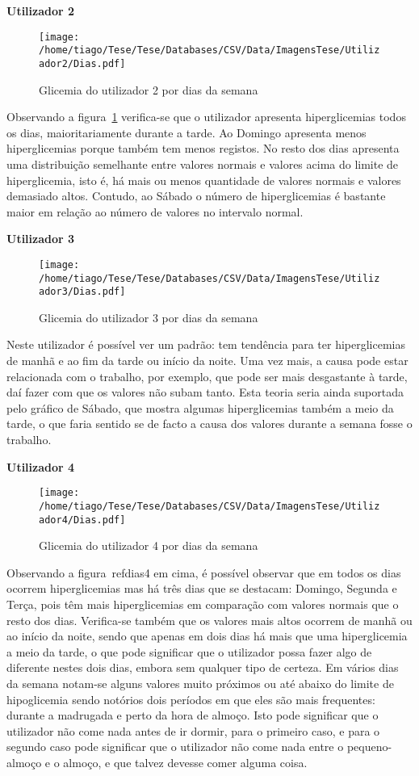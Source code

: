 \textbf{Utilizador 2}


\begin{figure}[H]
\centering
\texttt{[image: /home/tiago/Tese/Tese/Databases/CSV/Data/ImagensTese/Utilizador2/Dias.pdf]}
\caption{Glicemia do utilizador 2 por dias da semana}
\label{fig:dias2}
\end{figure}
Observando a figura~\ref{fig:dias2} verifica-se que o utilizador apresenta hiperglicemias todos os dias, maioritariamente durante a tarde. Ao Domingo apresenta menos hiperglicemias porque também tem menos registos. No resto dos dias apresenta uma distribuição semelhante entre valores normais e valores acima do limite de hiperglicemia, isto é, há mais ou menos quantidade de valores normais e valores demasiado altos. Contudo, ao Sábado o número de hiperglicemias é bastante maior em relação ao número de valores no intervalo normal.



\textbf{Utilizador 3}

\begin{figure}[H]
\centering
\texttt{[image: /home/tiago/Tese/Tese/Databases/CSV/Data/ImagensTese/Utilizador3/Dias.pdf]}
\caption{Glicemia do utilizador 3 por dias da semana}
\label{fig:dias3}
\end{figure}
Neste utilizador é possível ver um padrão: tem tendência para ter hiperglicemias de manhã e ao fim da tarde ou início da noite. Uma vez mais, a causa pode estar relacionada com o trabalho, por exemplo, que pode ser mais desgastante à tarde, daí fazer com que os valores não subam tanto. Esta teoria seria ainda suportada pelo gráfico de Sábado, que mostra algumas hiperglicemias também a meio da tarde, o que faria sentido se de facto a causa dos valores durante a semana fosse o trabalho. 

\textbf{Utilizador 4}

\begin{figure}[H]
\centering
\texttt{[image: /home/tiago/Tese/Tese/Databases/CSV/Data/ImagensTese/Utilizador4/Dias.pdf]}
\caption{Glicemia do utilizador 4 por dias da semana}
\label{fig:dias4}
\end{figure}
Observando a figura~ref{dias4} em cima, é possível observar que em todos os dias ocorrem hiperglicemias mas há três dias que se destacam: Domingo, Segunda e Terça, pois têm mais hiperglicemias em comparação com valores normais que o resto dos dias. Verifica-se também que os valores mais altos ocorrem de manhã ou ao início da noite, sendo que apenas em dois dias há mais que uma hiperglicemia a meio da tarde, o que pode significar que o utilizador possa fazer algo de diferente nestes dois dias, embora sem qualquer tipo de certeza. 
Em vários dias da semana notam-se alguns valores muito próximos ou até abaixo do limite de hipoglicemia sendo notórios dois períodos em que eles são mais frequentes: durante a madrugada e perto da hora de almoço. Isto pode significar que o utilizador não come nada antes de ir dormir, para o primeiro caso, e para o segundo caso pode significar que o utilizador não come nada entre o pequeno-almoço e o almoço, e que talvez devesse comer alguma coisa. 


